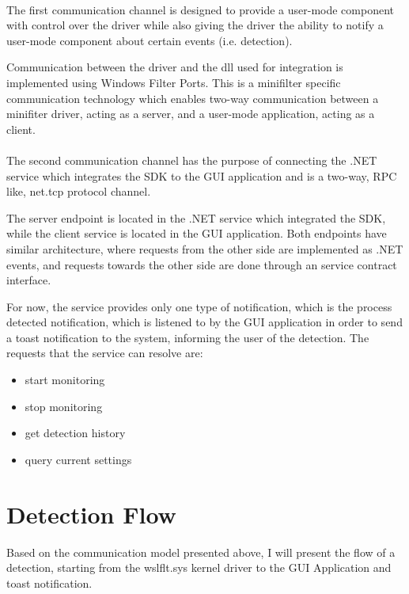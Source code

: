         \paragraph{}
        The first communication channel is designed to provide a user-mode component with control over the driver while also giving the driver
        the ability to notify a user-mode component about certain events (i.e. detection).
        
        Communication between the driver and the dll used for integration is implemented using Windows Filter Ports. This is a minifilter
        specific communication technology which enables two-way communication between a minifiter driver, acting as a server, and a user-mode
        application, acting as a client.

        \paragraph{}
        The second communication channel has the purpose of connecting the .NET service which integrates the SDK to the GUI application and is
        a two-way, RPC like, net.tcp protocol channel.

        The server endpoint is located in the .NET service which integrated the SDK, while the client service is located in the GUI application.
        Both endpoints have similar architecture, where requests from the other side are implemented as .NET events, and requests towards the other
        side are done through an service contract interface.

        For now, the service provides only one type of notification, which is the process detected notification, which is listened to by the GUI
        application in order to send a toast notification to the system, informing the user of the detection.
        The requests that the service can resolve are:
        
        \begin{itemize}
            \item start monitoring
            \item stop monitoring
            \item get detection history
            \item query current settings
        \end{itemize}

    \section{Detection Flow}
        Based on the communication model presented above, I will present the flow of a detection, starting from the wslflt.sys kernel driver
        to the GUI Application and toast notification.
        
